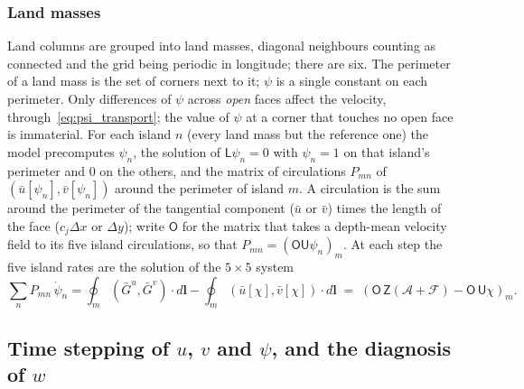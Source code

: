 \documentclass{article}
\begin{document}
\subsubsection*{Land masses}
Land columns are grouped into land masses, diagonal neighbours counting as connected and the grid being periodic in longitude; there are six.
The perimeter of a land mass is the set of corners next to it; $\psi$ is a single constant on each perimeter.
Only differences of $\psi$ across \emph{open} faces affect the velocity, through~\eqref{eq:psi_transport}; the value of $\psi$ at a corner that touches no open face is immaterial.
For each island $n$ (every land mass but the reference one) the model precomputes $\psi_n$, the solution of $\mathsf{L}\psi_n = 0$ with $\psi_n = 1$ on that island's perimeter and $0$ on the others, and the matrix of circulations $P_{mn}$ of $(\bar u[\psi_n], \bar v[\psi_n])$ around the perimeter of island $m$. A circulation is the sum around the perimeter of the tangential component ($\bar u$ or $\bar v$) times the length of the face ($c_j\Delta x$ or $\Delta y$); write $\mathsf{O}$ for the matrix that takes a depth-mean velocity field to its five island circulations, so that $P_{mn} = (\mathsf{O}\mathsf{U}\psi_n)_m$.
At each step the five island rates are the solution of the $5\times5$ system
\[
\sum_n P_{mn}\,\dot\psi_n = \oint_m \left( \bar G^u, \bar G^v \right)\cdot d\mathbf{l} - \oint_m \left( \bar u[\chi], \bar v[\chi] \right)\cdot d\mathbf{l}
\;=\; \left( \mathsf{O}\,\mathsf{Z}(\mathcal{A}+\mathcal{F}) - \mathsf{O}\,\mathsf{U}\chi \right)_m.
\]

\subsection{\texorpdfstring{Time stepping of $u$, $v$ and $\psi$, and the diagnosis of $w$}{Time stepping of u, v and psi, and the diagnosis of w}}\label{sec:mom_time}
\end{document}
